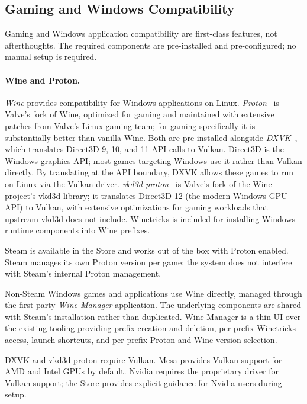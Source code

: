 \subsection{Gaming and Windows Compatibility}
\label{sec:gaming}

Gaming and Windows application compatibility are first-class features, not
afterthoughts. The required components are pre-installed and pre-configured;
no manual setup is required.

\paragraph{Wine and Proton.}
\emph{Wine} provides compatibility for Windows applications on Linux.
\emph{Proton}~\cite{proton} is Valve's fork of Wine, optimized for gaming
and maintained with extensive patches from Valve's Linux gaming team; for gaming specifically
it is substantially better than vanilla Wine. Both are pre-installed alongside
\emph{DXVK}~\cite{dxvk}, which translates Direct3D 9, 10, and 11 API
calls to Vulkan. Direct3D is the Windows graphics API; most games targeting
Windows use it rather than Vulkan directly. By translating at the API boundary,
DXVK allows these games to run on Linux via the Vulkan driver.
\emph{vkd3d-proton}~\cite{vkd3d:proton} is Valve's fork of the Wine project's
vkd3d library; it translates Direct3D 12 (the modern Windows GPU API) to
Vulkan, with extensive optimizations for gaming workloads that upstream vkd3d
does not include. Winetricks is included for installing Windows runtime components
into Wine prefixes.

Steam is available in the Store and works out of the box with Proton enabled.
Steam manages its own Proton version per game; the system does not interfere
with Steam's internal Proton management.

Non-Steam Windows games and applications use Wine directly, managed through
the first-party \emph{Wine Manager} application. The underlying components are
shared with Steam's installation rather than duplicated. Wine Manager is a thin
UI over the existing tooling providing prefix creation and deletion, per-prefix
Winetricks access, launch shortcuts, and per-prefix Proton and Wine version
selection.

DXVK and vkd3d-proton require Vulkan. Mesa provides Vulkan support for AMD
and Intel GPUs by default. Nvidia requires the proprietary driver for Vulkan
support; the Store provides explicit guidance for Nvidia users during setup.

